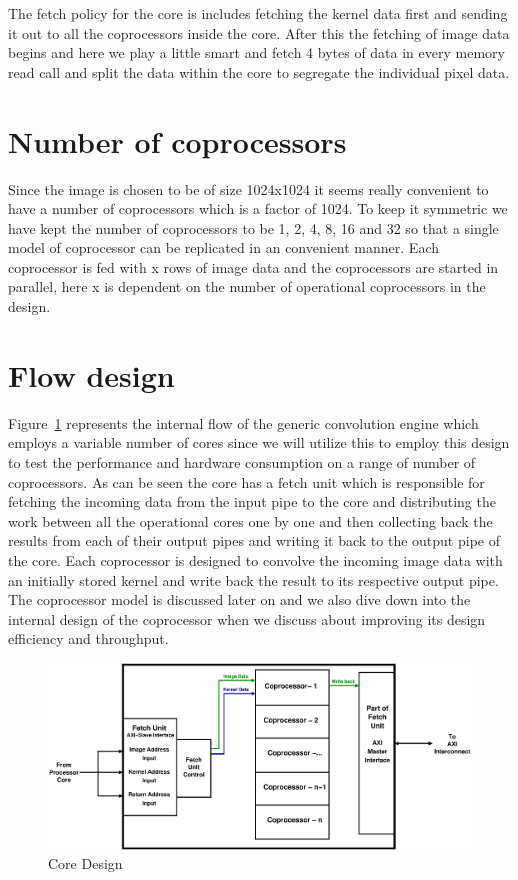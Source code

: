 The fetch policy for the core is includes fetching the kernel data first and sending it out to all the coprocessors inside the core. After
this the fetching of image data begins and here we play a little smart and fetch 4 bytes of data in every memory read call and split the
data within the core to segregate the individual pixel data. 

\section{Number of coprocessors}

Since the image is chosen to be of size 1024x1024 it seems really convenient to have a number of coprocessors which is a factor of 1024. To
keep it symmetric we have kept the number of coprocessors to be 1, 2, 4, 8, 16 and 32 so that a single model of coprocessor can be
replicated in an convenient manner. Each coprocessor is fed with x rows of image data and the coprocessors are started in parallel, here x is
dependent on the number of operational coprocessors in the design.

\section{Flow design}

Figure~\ref{convolution core} represents the internal flow of the generic convolution engine which employs a variable number of cores since
we will utilize this to employ this design to test the performance and hardware consumption on a range of number of coprocessors. As can be
seen the core has a fetch unit which is responsible for fetching the incoming data from the input pipe to the core and distributing the work
between all the operational cores one by one and then collecting back the results from each of their output pipes and writing it back to the output pipe
of the core. Each coprocessor is designed to convolve the incoming image data with an initially stored kernel and write back the result to
its respective output pipe. The coprocessor model is discussed later on and we also dive down into the internal design of the coprocessor
when we discuss about improving its design efficiency and throughput.

\begin{figure}[H]
\centering
\includegraphics[scale=0.5]{eps_pdf_sources/convolution_engine/core}
\caption{Core Design}
\label{convolution core}
\end{figure}

